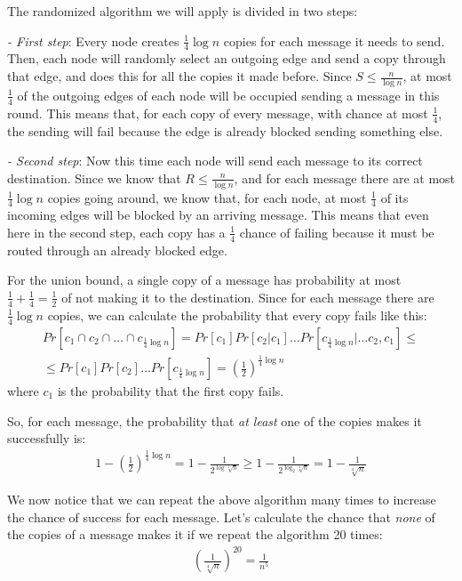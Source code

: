 \documentclass[a4paper,german]{article}
\begin{document}
\vspace{1em}

The randomized algorithm we will apply is divided in two steps:

\emph{- First step}: Every node creates $ \frac{1}{4} \log n $ copies for each message it needs to send.
Then, each node will randomly select an outgoing edge and send a copy through that edge, and does
this for all the copies it made before. Since $S \leq \frac{ n }{\log n}$, at most $ \frac{1}{4} $  of the
outgoing edges of each node will be occupied sending a message in this round. This means that, for each
copy of every message, with chance at most $ \frac{ 1 }{4 }$, the sending will fail because the edge
is already blocked sending something else.

\emph{- Second step}: Now this time each node will send each message to its correct destination. Since
we know that $R \leq \frac{ n }{\log n}$, and for each message there are at most $ \frac{ 1 }{4 } \log n$ copies
going around, we know that, for each node, at most $ \frac{ 1 }{4 }$ of its incoming edges will be blocked
by an arriving message. This means that even here in the second step, each copy has a $ \frac{ 1 }{4 }$ chance
of failing because it must be routed through an already blocked edge.

For the union bound, a single copy of a message has probability at most $ \frac{1 }{4 } + \frac{1 }{4 } = \frac{1 }{2 } $ of not making it to the 
destination. Since for each message there are $ \frac{1}{4} \log n $  copies, we can calculate the probability that every copy fails like this:
\begin{align*}
	Pr[c_1 \cap c_2 \cap \ldots \cap c_{\frac{1}{4} \log n}]  = 
	Pr[c_1] Pr[c_2 | c_1] \ldots Pr[c_{\frac{1}{4} \log n} | \ldots c_2,c_1] \leq  \\
	\leq Pr[c_1] Pr[c_2] \ldots Pr[c_{\frac{1}{4} \log n}]  = \left(\frac{1}{2}\right)^{\frac{1}{4} \log n}
\end{align*}
where $c_1$ is the probability that the first copy fails.

So, for each message, the probability that \emph{at least} one of the copies makes it successfully is:
\begin{align*}
1 - \left( \frac{1}{2} \right)^{ \frac{1}{4}\log n} = 
1 - \frac{1}{2^{\log \sqrt[4]{n}}} \geq
1 - \frac{1}{2^{\log_2 \sqrt[4]{n}}} =
1 - \frac{1}{\sqrt[4]{n}}
\end{align*}

We now notice that we can repeat the above algorithm many times to increase the chance of success for each message.
Let's calculate the chance that \emph{none} of the copies of a message makes it if we repeat the algorithm 20 times:
\begin{align*}
	\left( \frac{1}{\sqrt[4]{n}} \right)^{20} =  \frac{ 1 }{n^5}
\end{align*}
\end{document}
